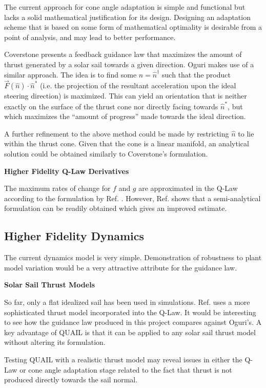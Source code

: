 The current approach for cone angle adaptation is simple and functional but lacks a solid mathematical justification for its design. Designing an adaptation scheme that is based on some form of mathematical optimality is desirable from a point of analysis, and may lead to better performance.

Coverstone \cite{coverstone2003technique} presents a feedback guidance law that maximizes the amount of thrust generated by a solar sail towards a given direction. Oguri \cite{oguri2023solar} makes use of a similar approach. The idea is to find some \(\hat{n} = \hat{n}^\dagger\) such that the product \(\vec{F}(\hat{n}) \cdot \hat{n}^*\) (i.e. the projection of the resultant acceleration upon the ideal steering direction) is maximized. This can yield an orientation that is neither exactly on the surface of the thrust cone nor directly facing towards \(\hat{n}^*\), but which maximizes the ``amount of progress'' made towards the ideal direction.

A further refinement to the above method could be made by restricting \(\hat{n}\) to lie within the thrust cone. Given that the cone is a linear manifold, an analytical solution could be obtained similarly to Coverstone's formulation.

\textbf{Higher Fidelity Q-Law Derivatives}

The maximum rates of change for \(f\) and \(g\) are approximated in the Q-Law according to the formulation by Ref. \cite{vargaperez2016}. However, Ref. \cite{sanjeev2023} shows that a semi-analytical formulation can be readily obtained which gives an improved estimate.

\subsection{Higher Fidelity Dynamics}
The current dynamics model is very simple. Demonstration of robustness to plant model variation would be a very attractive attribute for the guidance law.

\textbf{Solar Sail Thrust Models}

So far, only a flat idealized sail has been used in simulations. Ref. \cite{oguri2023solar} uses a more sophisticated thrust model incorporated into the Q-Law. It would be interesting to see how the guidance law produced in this project compares against Oguri's. A key advantage of QUAIL is that it can be applied to any solar sail thrust model without altering its formulation.

Testing QUAIL with a realistic thrust model may reveal issues in either the Q-Law or cone angle adaptation stage related to the fact that thrust is not produced directly towards the sail normal.

